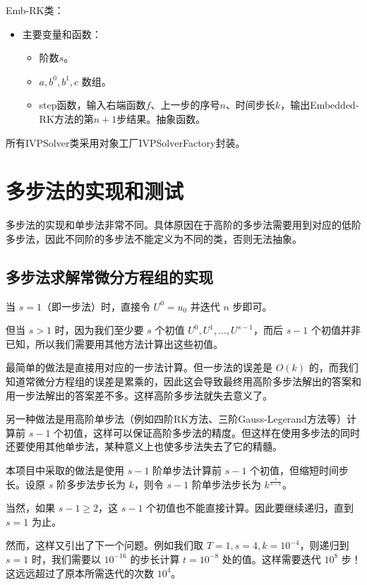 \documentclass{ctexart}
\begin{document}
	Emb-RK类：
	\begin{itemize}
		\item 主要变量和函数：
		\begin{itemize}
			\item 阶数$s$。
			\item $a,b^0,b^1,c$ 数组。
			\item step函数，输入右端函数$f$、上一步的序号$n$、时间步长$k$，输出Embedded-RK方法的第$n+1$步结果。抽象函数。
		\end{itemize}
	\end{itemize}

	所有IVPSolver类采用对象工厂IVPSolverFactory封装。

\section{多步法的实现和测试}

多步法的实现和单步法非常不同。具体原因在于高阶的多步法需要用到对应的低阶多步法，因此不同阶的多步法不能定义为不同的类，否则无法抽象。

\subsection{多步法求解常微分方程组的实现}

当 $s=1$（即一步法）时，直接令 $U^0=u_0$ 并迭代 $n$ 步即可。

但当 $s>1$ 时，因为我们至少要 $s$ 个初值 $U^0,U^1,\dots,U^{s-1}$，而后 $s-1$ 个初值并非已知，所以我们需要用其他方法计算出这些初值。

最简单的做法是直接用对应的一步法计算。但一步法的误差是 $O(k)$ 的，而我们知道常微分方程组的误差是累乘的，因此这会导致最终用高阶多步法解出的答案和用一步法解出的答案差不多。这样高阶多步法就失去意义了。

另一种做法是用高阶单步法（例如四阶RK方法、三阶Gauss-Legerand方法等）计算前 $s-1$ 个初值，这样可以保证高阶多步法的精度。但这样在使用多步法的同时还要使用其他单步法，某种意义上也使多步法失去了它的精髓。

本项目中采取的做法是使用 $s-1$ 阶单步法计算前 $s-1$ 个初值，但缩短时间步长。设原 $s$ 阶多步法步长为 $k$，则令 $s-1$ 阶单步法步长为 $k^{\frac s{s-1}}$。

当然，如果 $s-1\geq 2$，这 $s-1$ 个初值也不能直接计算。因此要继续递归，直到 $s=1$ 为止。

然而，这样又引出了下一个问题。例如我们取 $T=1,s=4,k=10^{-4}$，则递归到 $s=1$ 时，我们需要以 $10^{-16}$ 的步长计算 $t=10^{-8}$ 处的值。这样需要迭代 $10^8$ 步！这远远超过了原本所需迭代的次数 $10^4$。
\end{document}
